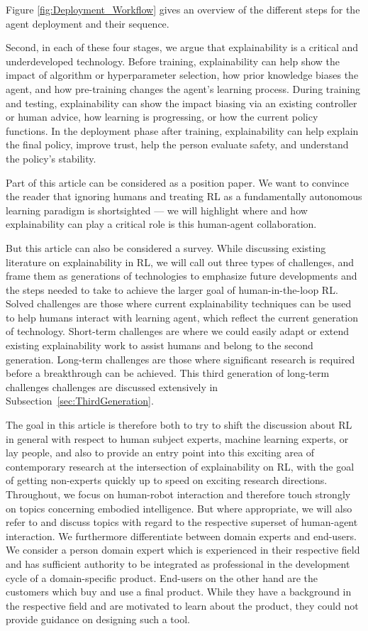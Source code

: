 \documentclass[twoside,11pt]{article}
\begin{document}
Figure \ref{fig:Deployment_Workflow} gives an overview of the different steps for the agent deployment and their sequence.

Second, in each of these four stages, we argue that explainability is a critical and underdeveloped technology. Before training, explainability can help show the impact of algorithm or hyperparameter selection, how prior knowledge biases the agent, and how pre-training changes the agent's learning process. During training and testing, explainability can show the impact biasing via an existing controller or human advice, how learning is progressing, or how the current policy functions. In the deployment phase after training, explainability can help explain the final policy, improve trust, help the person evaluate safety, and understand the policy's stability.

Part of this article can be considered as a position paper. We want to convince the reader that ignoring humans and treating RL as a fundamentally autonomous learning paradigm is shortsighted --- we will highlight where and how explainability can play a critical role is this human-agent collaboration. 

But this article can also be considered a survey. While discussing existing literature on explainability in RL, we will call out three types of challenges, and frame them as generations of technologies to emphasize future developments and the steps needed to take to achieve the larger goal of human-in-the-loop RL. Solved challenges are those where current explainability techniques can be used to help humans interact with learning agent, which reflect the current generation of technology. Short-term challenges are where we could easily adapt or extend existing explainability work to assist humans and belong to the second generation. Long-term challenges are those where significant research is required before a breakthrough can be achieved. This third generation of long-term challenges challenges are discussed extensively in Subsection~\ref{sec:ThirdGeneration}.

The goal in this article is therefore both to try to shift the discussion about RL in general with respect to human subject experts, machine learning experts, or lay people, and also to provide an entry point into this exciting area of contemporary research at the intersection of explainability on RL, with the goal of getting non-experts quickly up to speed on exciting research directions. Throughout, we focus on human-robot interaction and therefore touch strongly on topics concerning embodied intelligence. But where appropriate, we will also refer to and discuss topics with regard to the respective superset of human-agent interaction. We furthermore differentiate between domain experts and end-users. We consider a person domain expert which is experienced in their respective field and has sufficient authority to be integrated as professional in the development cycle of a domain-specific product. End-users on the other hand are the customers which buy and use a final product. While they have a background in the respective field and are motivated to learn about the product, they could not provide guidance on designing such a tool.
\end{document}
